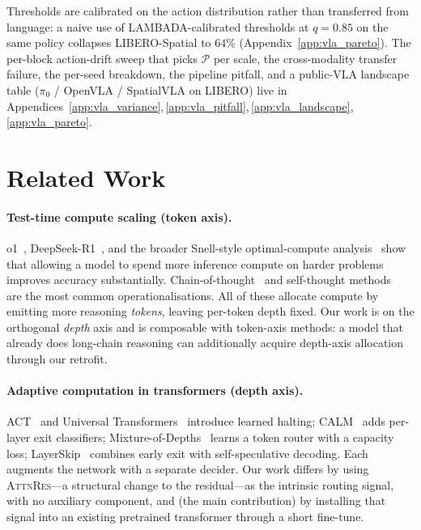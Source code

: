 \documentclass{article}
\newcommand{\attnres}{\textsc{AttnRes}}
\begin{document}
Thresholds are calibrated on the action distribution rather than transferred from language: a naive use of LAMBADA-calibrated thresholds at $q{=}0.85$ on the same policy collapses LIBERO-Spatial to $64\%$ (Appendix~\ref{app:vla_pareto}). The per-block action-drift sweep that picks $\mathcal{P}$ per scale, the cross-modality transfer failure, the per-seed breakdown, the pipeline pitfall, and a public-VLA landscape table ($\pi_0$ / OpenVLA / SpatialVLA on LIBERO) live in Appendices~\ref{app:vla_variance},\,\ref{app:vla_pitfall},\,\ref{app:vla_landscape},\,\ref{app:vla_pareto}.

\section{Related Work}
\label{sec:related}

\paragraph{Test-time compute scaling (token axis).}
o1~\citep{openai2024o1}, DeepSeek-R1~\citep{deepseek2025r1}, and the broader Snell-style optimal-compute analysis~\citep{snell2024scaling} show that allowing a model to spend more inference compute on harder problems improves accuracy substantially. Chain-of-thought~\citep{wei2022chain} and self-thought methods~\citep{zelikman2024quietstar} are the most common operationalisations. All of these allocate compute by emitting more reasoning \emph{tokens}, leaving per-token depth fixed. Our work is on the orthogonal \emph{depth} axis and is composable with token-axis methods: a model that already does long-chain reasoning can additionally acquire depth-axis allocation through our retrofit.

\paragraph{Adaptive computation in transformers (depth axis).}
ACT~\citep{graves2016adaptive} and Universal Transformers~\citep{dehghani2018universal} introduce learned halting; CALM~\citep{schuster2022confident} adds per-layer exit classifiers; Mixture-of-Depths~\citep{raposo2024mixture} learns a token router with a capacity loss; LayerSkip~\citep{elhoushi2024layerskip} combines early exit with self-speculative decoding. Each augments the network with a separate decider. Our work differs by using \attnres{}---a structural change to the residual---as the intrinsic routing signal, with no auxiliary component, and (the main contribution) by installing that signal into an existing pretrained transformer through a short fine-tune.
\end{document}
